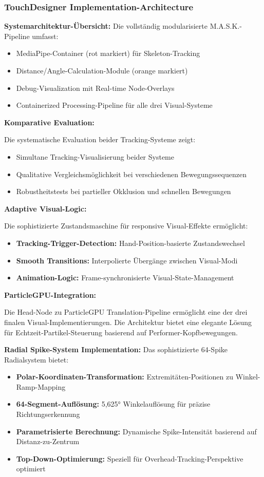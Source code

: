 \subsubsection{TouchDesigner Implementation-Architecture}


\textbf{Systemarchitektur-Übersicht:}
Die vollständig modularisierte M.A.S.K.-Pipeline umfasst:
\begin{itemize}
    \item MediaPipe-Container (rot markiert) für Skeleton-Tracking
    \item Distance/Angle-Calculation-Module (orange markiert)
    \item Debug-Visualization mit Real-time Node-Overlays
    \item Containerized Processing-Pipeline für alle drei Visual-Systeme
\end{itemize}


\textbf{Komparative Evaluation:}
\raggedright Die systematische Evaluation beider Tracking-Systeme zeigt:
\begin{itemize}
    \item Simultane Tracking-Visualisierung beider Systeme
    \item Qualitative Vergleichsmöglichkeit bei verschiedenen Bewegungssequenzen
    \item Robustheitstests bei partieller Okklusion und schnellen Bewegungen
\end{itemize}


\newpage


\textbf{Adaptive Visual-Logic:}
\raggedright Die sophistizierte Zustandsmaschine für responsive Visual-Effekte ermöglicht:
\begin{itemize}
    \item \textbf{Tracking-Trigger-Detection:} Hand-Position-basierte Zustandswechsel
    \item \textbf{Smooth Transitions:} Interpolierte Übergänge zwischen Visual-Modi
    \item \textbf{Animation-Logic:} Frame-synchronisierte Visual-State-Management
\end{itemize}


\textbf{ParticleGPU-Integration:}
\raggedright Die Head-Node zu ParticleGPU Translation-Pipeline ermöglicht eine der drei finalen Visual-Implementierungen. Die Architektur bietet eine elegante Lösung für Echtzeit-Partikel-Steuerung basierend auf Performer-Kopfbewegungen.

\newpage


\textbf{Radial Spike-System Implementation:}
Das sophistizierte 64-Spike Radialsystem bietet:
\begin{itemize}
    \item \textbf{Polar-Koordinaten-Transformation:} Extremitäten-Positionen zu Winkel-Ramp-Mapping
    \item \textbf{64-Segment-Auflösung:} 5,625° Winkelauflösung für präzise Richtungserkennung
    \item \textbf{Parametrisierte Berechnung:} Dynamische Spike-Intensität basierend auf Distanz-zu-Zentrum
    \item \textbf{Top-Down-Optimierung:} Speziell für Overhead-Tracking-Perspektive optimiert
\end{itemize}

